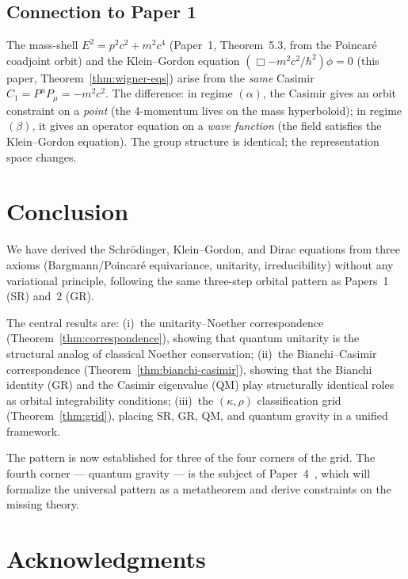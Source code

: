\documentclass[12pt]{article}
\theoremstyle{plain}
\theoremstyle{definition}
\theoremstyle{remark}
\begin{document}
\subsection{Connection to Paper 1}

The mass-shell $E^2 = p^2c^2 + m^2c^4$ (Paper~1, Theorem~5.3, from the Poincar\'e coadjoint orbit) and the Klein--Gordon equation $(\Box - m^2c^2/\hbar^2)\phi = 0$ (this paper, Theorem~\ref{thm:wigner-eqs}) arise from the \emph{same} Casimir $C_1 = P^\mu P_\mu = -m^2c^2$. The difference: in regime $(\alpha)$, the Casimir gives an orbit constraint on a \emph{point} (the 4-momentum lives on the mass hyperboloid); in regime $(\beta)$, it gives an operator equation on a \emph{wave function} (the field satisfies the Klein--Gordon equation). The group structure is identical; the representation space changes.


\section{Conclusion}
\label{sec:conclusion}

We have derived the Schr\"odinger, Klein--Gordon, and Dirac equations from three axioms (Bargmann/Poincar\'e equivariance, unitarity, irreducibility) without any variational principle, following the same three-step orbital pattern as Papers~1 (SR) and~2 (GR).

The central results are: (i)~the unitarity--Noether correspondence (Theorem~\ref{thm:correspondence}), showing that quantum unitarity is the structural analog of classical Noether conservation; (ii)~the Bianchi--Casimir correspondence (Theorem~\ref{thm:bianchi-casimir}), showing that the Bianchi identity (GR) and the Casimir eigenvalue (QM) play structurally identical roles as orbital integrability conditions; (iii)~the $(\kappa, \rho)$ classification grid (Theorem~\ref{thm:grid}), placing SR, GR, QM, and quantum gravity in a unified framework.

The pattern is now established for three of the four corners of the grid. The fourth corner --- quantum gravity --- is the subject of Paper~4~\cite{nembe2026p4}, which will formalize the universal pattern as a metatheorem and derive constraints on the missing theory.


\section*{Acknowledgments}
\end{document}
